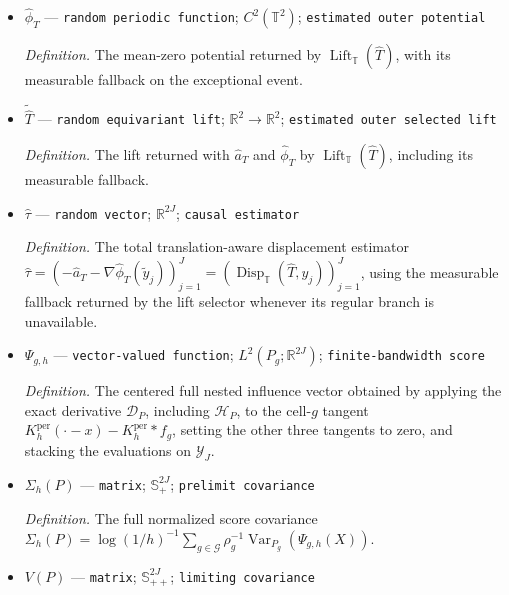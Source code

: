 \documentclass{article}
\begin{document}
\begin{itemize}
  \par\smallskip\noindent\emph{Definition.} The half-open-cell translation returned by \(\operatorname{Lift}_{\mathbb T}(\widehat T)\), with its measurable fallback on the exceptional event.
  \item \(\widehat\phi_T\) --- \texttt{random periodic function}; \(C^2(\mathbb T^2)\); \texttt{estimated outer potential}
  \par\smallskip\noindent\emph{Definition.} The mean-zero potential returned by \(\operatorname{Lift}_{\mathbb T}(\widehat T)\), with its measurable fallback on the exceptional event.
  \item \(\widetilde{\widehat T}\) --- \texttt{random equivariant lift}; \(\mathbb R^2\to\mathbb R^2\); \texttt{estimated outer selected lift}
  \par\smallskip\noindent\emph{Definition.} The lift returned with \(\widehat a_T\) and \(\widehat\phi_T\) by \(\operatorname{Lift}_{\mathbb T}(\widehat T)\), including its measurable fallback.
  \item \(\widehat\tau\) --- \texttt{random vector}; \(\mathbb R^{2J}\); \texttt{causal estimator}
  \par\smallskip\noindent\emph{Definition.} The total translation-aware displacement estimator \(\widehat\tau=(-\widehat a_T-\nabla\widehat\phi_T(\widetilde y_j))_{j=1}^J=(\operatorname{Disp}_{\mathbb T}(\widehat T,y_j))_{j=1}^J\), using the measurable fallback returned by the lift selector whenever its regular branch is unavailable.
  \item \(\Psi_{g,h}\) --- \texttt{vector-\allowbreak{}valued function}; \(L^2(P_g;\mathbb R^{2J})\); \texttt{finite-\allowbreak{}bandwidth score}
  \par\smallskip\noindent\emph{Definition.} The centered full nested influence vector obtained by applying the exact derivative \(\mathcal D_P\), including \(\mathcal H_P\), to the cell-\(g\) tangent \(K_h^{\mathrm{per}}(\cdot-x)-K_h^{\mathrm{per}}*f_g\), setting the other three tangents to zero, and stacking the evaluations on \(\mathcal Y_J\).
  \item \(\Sigma_h(P)\) --- \texttt{matrix}; \(\mathbb S_+^{2J}\); \texttt{prelimit covariance}
  \par\smallskip\noindent\emph{Definition.} The full normalized score covariance \(\Sigma_h(P)=\log(1/h)^{-1}\sum_{g\in\mathcal G}\rho_g^{-1}\operatorname{Var}_{P_g}(\Psi_{g,h}(X))\).
  \item \(V(P)\) --- \texttt{matrix}; \(\mathbb S_{++}^{2J}\); \texttt{limiting covariance}

\end{itemize}
\end{document}
